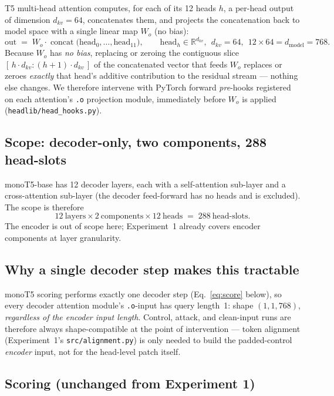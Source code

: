 \documentclass[11pt]{article}
\begin{document}
T5 multi-head attention computes, for each of its 12 heads $h$, a per-head
output of dimension $d_{kv}=64$, concatenates them, and projects the
concatenation back to model space with a single linear map $W_o$ (no bias):
\begin{equation}
\text{out} \;=\; W_o \cdot \operatorname{concat}\big(\text{head}_0,\dots,\text{head}_{11}\big),
\qquad \text{head}_h \in \mathbb{R}^{d_{kv}},\ \ d_{kv}=64,\ \ 12\times64=d_{\text{model}}=768.
\label{eq:headconcat}
\end{equation}
Because $W_o$ has \emph{no bias}, replacing or zeroing the contiguous slice
$[\,h\cdot d_{kv} : (h{+}1)\cdot d_{kv}\,]$ of the concatenated vector that
feeds $W_o$ replaces or zeroes \emph{exactly} that head's additive
contribution to the residual stream — nothing else changes. We therefore
intervene with PyTorch forward \emph{pre}-hooks registered on each
attention's \texttt{.o} projection module, immediately before $W_o$ is
applied (\texttt{headlib/head\_hooks.py}).

\subsection{Scope: decoder-only, two components, 288 head-slots}

monoT5-base has 12 decoder layers, each with a self-attention sub-layer and a
cross-attention sub-layer (the decoder feed-forward has no heads and is
excluded). The scope is therefore
\[
12~\text{layers} \times 2~\text{components} \times 12~\text{heads}
\;=\; 288~\text{head-slots.}
\]
The encoder is out of scope here; Experiment~1 already covers encoder
components at layer granularity.

\subsection{Why a single decoder step makes this tractable}

monoT5 scoring performs exactly one decoder step (Eq.~\ref{eq:score} below),
so every decoder attention module's \texttt{.o}-input has query length~1:
shape $(1,1,768)$, \emph{regardless of the encoder input length}. Control,
attack, and clean-input runs are therefore always shape-compatible at the
point of intervention — token alignment (Experiment~1's
\texttt{src/alignment.py}) is only needed to build the padded-control
\emph{encoder} input, not for the head-level patch itself.

\subsection{Scoring (unchanged from Experiment 1)}
\end{document}
